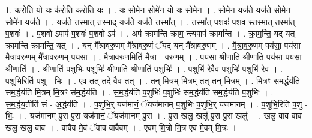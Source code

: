 \documentclass[17pt]{extarticle}
\begin{document}
1. क॒रो॒ति॒ यो यः क॑रोति करोति॒ यः । . यः सोमे॑न॒ सोमे॑न॒ यो यः सोमे॑न । . सोमे॑न॒ यज॑ते॒ यज॑ते॒ सोमे॑न॒ सोमे॑न॒ यज॑ते । . यज॑ते॒ तस्मा॒त् तस्मा॒द् यज॑ते॒ यज॑ते॒ तस्मा᳚त् । . तस्मा᳚त् प॒शवः॑ प॒शव॒ स्तस्मा॒त् तस्मा᳚त् प॒शवः॑ । . प॒शवो ऽपाप॑ प॒शवः॑ प॒शवो ऽप॑ । . अप॑ क्रामन्ति क्राम॒ न्त्यपाप॑ क्रामन्ति । . क्रा॒म॒न्ति॒ यद् यत् क्रा॑मन्ति क्रामन्ति॒ यत् । . यन् मै᳚त्रावरु॒णम् मै᳚त्रावरु॒णं ॅयद् यन् मै᳚त्रावरु॒णम् । . मै॒त्रा॒व॒रु॒णम् पय॑सा॒ पय॑सा मैत्रावरु॒णम् मै᳚त्रावरु॒णम् पय॑सा । . मै॒त्रा॒व॒रु॒णमिति॑ मैत्रा - व॒रु॒णम् । . पय॑सा श्री॒णाति॑ श्री॒णाति॒ पय॑सा॒ पय॑सा श्री॒णाति॑ । . श्री॒णाति॑ प॒शुभिः॑ प॒शुभिः॑ श्री॒णाति॑ श्री॒णाति॑ प॒शुभिः॑ । . प॒शुभि॑ रे॒वैव प॒शुभिः॑ प॒शुभि॑ रे॒व । . प॒शुभि॒रिति॑ प॒शु - भिः॒ । . ए॒व तत् तदे॒ वैव तत् । . तन् मि॒त्रम् मि॒त्रम् तत् तन् मि॒त्रम् । . मि॒त्रꣳ स॑म॒र्द्धय॑ति सम॒र्द्धय॑ति मि॒त्रम् मि॒त्रꣳ स॑म॒र्द्धय॑ति । . स॒म॒र्द्धय॑ति प॒शुभिः॑ प॒शुभिः॑ सम॒र्द्धय॑ति सम॒र्द्धय॑ति प॒शुभिः॑ । . स॒म॒र्द्धय॒तीति॑ सं - अ॒र्द्धय॑ति । . प॒शुभि॒र् यज॑मानं॒ ॅयज॑मानम् प॒शुभिः॑ प॒शुभि॒र् यज॑मानम् । . प॒शुभि॒रिति॑ प॒शु - भिः॒ । . यज॑मानम् पु॒रा पु॒रा यज॑मानं॒ ॅयज॑मानम् पु॒रा । . पु॒रा खलु॒ खलु॑ पु॒रा पु॒रा खलु॑ । . खलु॒ वाव वाव खलु॒ खलु॒ वाव । . वावैव मे॒वं ॅवाव वावैवम् । . ए॒वम् मि॒त्रो मि॒त्र ए॒व मे॒वम् मि॒त्रः । \newline
\end{document}
